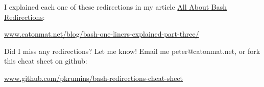 \documentclass{article}
\begin{document}
\vfill

I explained each one of these redirections in my article \href{http://www.catonmat.net/blog/bash-one-liners-explained-part-three/}{All About Bash Redirections}: \par
\href{http://www.catonmat.net/blog/bash-one-liners-explained-part-three/}{www.catonmat.net/blog/bash-one-liners-explained-part-three/}

\vfill

Did I miss any redirections? Let me know! Email me peter@catonmat.net, or fork this cheat sheet on github: \par \href{http://github.com/pkrumins/bash-redirections-cheat-sheet}{www.github.com/pkrumins/bash-redirections-cheat-sheet}

\vfill

\end{document}
